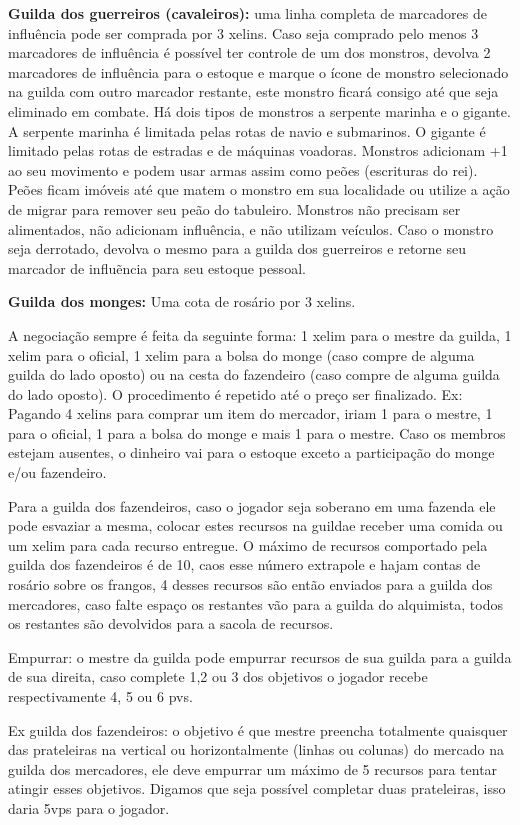 \documentclass[11pt]{article}
\begin{document}
\textbf{Guilda dos guerreiros (cavaleiros):} uma linha completa de marcadores de influência pode ser comprada por 3 xelins.
Caso seja comprado pelo menos 3 marcadores de influência é possível ter controle de um dos monstros, devolva 2 marcadores de influência para o estoque e marque o ícone de monstro selecionado
na guilda com outro marcador restante, este monstro ficará consigo até que seja eliminado em combate.
Há dois tipos de monstros a serpente marinha e o gigante. A serpente marinha é limitada pelas rotas de navio e submarinos. O gigante é limitado pelas rotas de estradas e de máquinas voadoras.
Monstros adicionam +1 ao seu movimento e podem usar armas assim como peões (escrituras do rei).
Peões ficam imóveis até que matem o monstro em sua localidade ou utilize a ação de migrar para remover seu peão do tabuleiro.
Monstros não precisam ser alimentados, não adicionam influência, e não utilizam veículos.
Caso o monstro seja derrotado, devolva o mesmo para a guilda dos guerreiros e retorne seu marcador de influẽncia para seu estoque pessoal.

\textbf{Guilda dos monges:} Uma cota de rosário por 3 xelins.

A negociação sempre é feita da seguinte forma: 1 xelim para o mestre da guilda, 1 xelim para o oficial, 1 xelim para a bolsa do monge (caso compre de alguma guilda do lado oposto)
ou na cesta do fazendeiro (caso compre de alguma guilda do lado oposto).
O procedimento é repetido até o preço ser finalizado. Ex: Pagando 4 xelins para comprar um item do mercador, iriam 1 para o mestre, 1 para o oficial, 1 para a bolsa do monge
e mais 1 para o mestre. Caso os membros estejam ausentes, o dinheiro vai para o estoque exceto a participação do monge e/ou fazendeiro.

Para a guilda dos fazendeiros, caso o jogador seja soberano em uma fazenda ele pode esvaziar a mesma, colocar estes recursos na guildae receber uma comida ou um xelim para cada recurso entregue. O máximo de recursos comportado
pela guilda dos fazendeiros é de 10, caos esse número extrapole e hajam contas de rosário sobre os frangos, 4 desses recursos são então enviados para a guilda dos mercadores, caso falte espaço os restantes vão para a guilda
do alquimista, todos os restantes são devolvidos para a sacola de recursos.

Empurrar: o mestre da guilda pode empurrar recursos de sua guilda para a guilda de sua direita, caso complete 1,2 ou 3 dos objetivos o jogador recebe respectivamente 4, 5 ou 6 pvs.

Ex guilda dos fazendeiros: o objetivo é que  mestre preencha totalmente quaisquer das prateleiras na vertical ou horizontalmente (linhas ou colunas) do mercado na guilda dos mercadores,
ele deve empurrar um máximo de 5 recursos para tentar atingir esses objetivos. Digamos que seja possível completar duas prateleiras, isso daria 5vps para o jogador.
\end{document}

